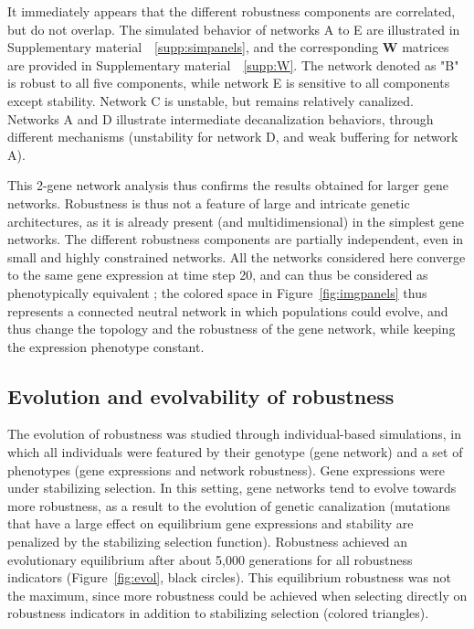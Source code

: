 \documentclass[a4paper]{article}
\newcommand{\SupMat}{Supplementary material~}
\begin{document}
It immediately appears that the different robustness components are correlated, but do not overlap. The simulated behavior of networks A to E are illustrated in \SupMat~\ref{supp:simpanels}, and the corresponding $\bm W$ matrices are provided in \SupMat~\ref{supp:W}. The network denoted as "B" is robust to all five components, while network E is sensitive to all components except stability. Network C is unstable, but remains relatively canalized. Networks A and D illustrate intermediate decanalization behaviors, through different mechanisms (unstability for network D, and weak buffering for network A). 

This 2-gene network analysis thus confirms the results obtained for larger gene networks. Robustness is thus not a feature of large and intricate genetic architectures, as it is already present (and multidimensional) in the simplest gene networks. The different robustness components are partially independent, even in small and highly constrained networks. All the networks considered here converge to the same gene expression at time step 20, and can thus be considered as phenotypically equivalent ; the colored space in Figure~\ref{fig:imgpanels} thus represents a connected neutral network in which populations could evolve, and thus change the topology and the robustness of the gene network, while keeping the expression phenotype constant. 

\subsection{Evolution and evolvability of robustness}

The evolution of robustness was studied through individual-based simulations, in which all individuals were featured by their genotype (gene network) and a set of phenotypes (gene expressions and network robustness). Gene expressions were under stabilizing selection. In this setting, gene networks tend to evolve towards more robustness, as a result to the evolution of genetic canalization (mutations that have a large effect on equilibrium gene expressions and stability are penalized by the stabilizing selection function). Robustness achieved an evolutionary equilibrium after about 5,000 generations for all robustness indicators (Figure~\ref{fig:evol}, black circles). This equilibrium robustness was not the maximum, since more robustness could be achieved when selecting directly on robustness indicators in addition to stabilizing selection (colored triangles). 
\end{document}
